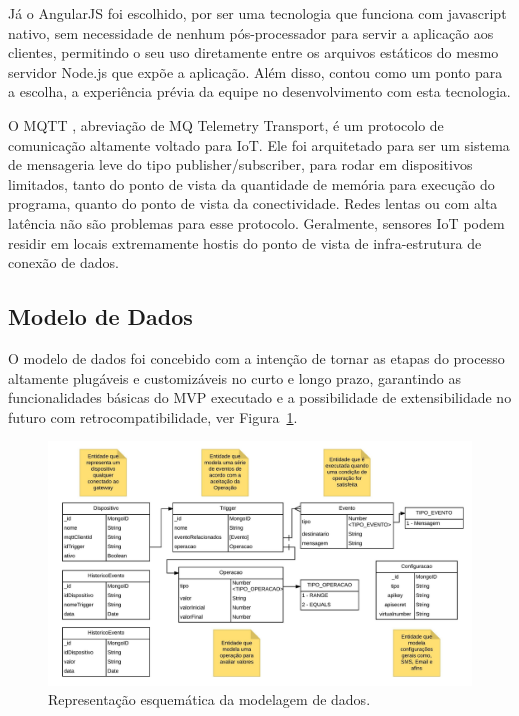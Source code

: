 Já o AngularJS \cite{AngularJS} foi escolhido, por ser uma tecnologia que funciona com javascript nativo, sem necessidade de nenhum pós-processador para servir a aplicação aos clientes, permitindo o seu uso diretamente entre os arquivos estáticos do mesmo servidor Node.js que expõe a aplicação. Além disso, contou como um ponto para a escolha, a experiência prévia da equipe no desenvolvimento com esta tecnologia.

O MQTT \cite{Mqtt}, abreviação de MQ Telemetry Transport, é um protocolo de comunicação altamente voltado para IoT. Ele foi arquitetado para ser um sistema de mensageria leve do tipo publisher/subscriber, para rodar em dispositivos limitados, tanto do ponto de vista da quantidade de memória para execução do programa, quanto do ponto de vista da conectividade. Redes lentas ou com alta latência não são problemas para esse protocolo. Geralmente, sensores IoT podem residir em locais extremamente hostis do ponto de vista de infra-estrutura de conexão de dados.

\subsection{Modelo de Dados}
O modelo de dados foi concebido com a intenção de tornar as etapas do processo altamente plugáveis e customizáveis no curto e longo prazo, garantindo as funcionalidades básicas do MVP executado e a possibilidade de extensibilidade no futuro com retrocompatibilidade, ver Figura~\ref{fig:modeloDeDados}.

\begin{figure}[h!]
	\begin{center}
		\includegraphics[width=1.085\textwidth]{./img/modelo-de-dados}
		\caption{Representação esquemática da modelagem de dados.}
		\label{fig:modeloDeDados}
	\end{center}
\end{figure}

